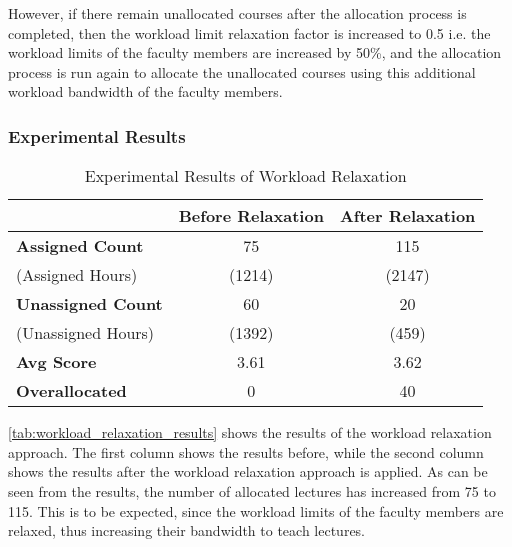 However, if there remain unallocated courses after the allocation process is completed, then the workload limit relaxation factor is increased to 0.5 i.e. the workload limits of the faculty members are increased by 50\%, and the allocation process is run again to allocate the unallocated courses using this additional workload bandwidth of the faculty members.

\subsubsection{Experimental Results}

\begin{table}[H]
  \centering
  \begin{tabular}{|l|c|c|}
    \hline
    \textbf{}                 & \textbf{Before Relaxation} & \textbf{After Relaxation} \\ \hline
    \textbf{Assigned Count}   & 75                         & 115                       \\
    (Assigned Hours)          & (1214)                     & (2147)                    \\
    \textbf{Unassigned Count} & 60                         & 20                        \\
    (Unassigned Hours)        & (1392)                     & (459)                     \\
    \textbf{Avg Score}        & 3.61                       & 3.62                      \\
    \textbf{Overallocated}    & 0                          & 40                        \\ \hline
  \end{tabular}
  \caption{Experimental Results of Workload Relaxation}
  \label{tab:workload_relaxation_results}
\end{table}

\autoref{tab:workload_relaxation_results} shows the results of the workload relaxation approach. The first column shows the results before, while the second column shows the results after the workload relaxation approach is applied. As can be seen from the results, the number of allocated lectures has increased from 75 to 115. This is to be expected, since the workload limits of the faculty members are relaxed, thus increasing their bandwidth to teach lectures.


